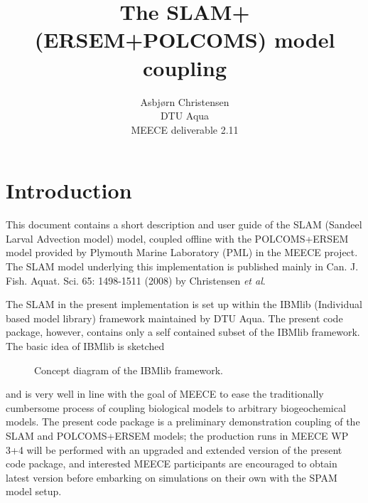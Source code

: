 
\title{The SLAM+(ERSEM+POLCOMS) model coupling }
\author{Asbj{\o}rn Christensen \\ DTU Aqua \\ MEECE deliverable 2.11}


\maketitle  

\section{Introduction}

This document contains a short description and user guide 
of the SLAM (Sandeel Larval Advection model) model, 
coupled offline with the POLCOMS+ERSEM model
provided by Plymouth Marine Laboratory (PML) in the MEECE project. 
The SLAM model underlying this implementation is published
mainly in Can. J. Fish. Aquat. Sci. 65: 1498-1511 (2008) by Christensen {\em et al}.
  
The SLAM in the present implementation is set up within
the IBMlib (Individual based model library) framework maintained by DTU Aqua.
The present code package, however, contains only a self contained subset of the IBMlib
framework. The basic idea of IBMlib is sketched
\begin{figure}[p]   %
\begin{center}                                                  %
\end{center}                                                    %
\caption{Concept diagram of the IBMlib framework.}
\label{cmp1Dvs2D}
\end{figure}
and is very well in line with the goal of MEECE to ease the traditionally cumbersome 
process of coupling biological models to arbitrary biogeochemical models.
The present code package is a preliminary demonstration coupling of the SLAM and 
POLCOMS+ERSEM models; the production runs in MEECE WP 3+4 will be performed with an
upgraded and extended version of the present code package, and interested MEECE
participants are encouraged to obtain latest version before embarking on simulations
on their own with the SPAM model setup.
 
